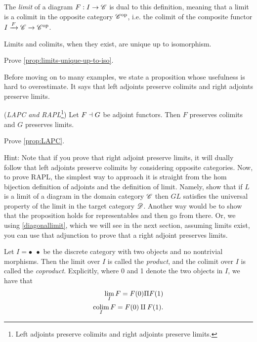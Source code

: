 \documentclass{article}[11pt]
\renewcommand{\dot}{\bullet }
\begin{document}
The \textit{limit} of a diagram $F: I \to \mathscr{C}$ is dual to this definition, meaning that a limit is a colimit in the opposite category $\mathscr{C}^{\text{op}}$, i.e. the colimit of the composite functor $I\xrightarrow{F} \mathscr{C} \to \mathscr{C}^{\text{op}}$.

\begin{proposition}\label{prop:limits-unique-up-to-iso} Limits and colimits, when they exist, are unique up to isomorphism.
\end{proposition}

\begin{exercise}
Prove \autoref{prop:limits-unique-up-to-iso}.
\end{exercise}

Before moving on to many examples, we state a proposition whose usefulness is hard to overestimate. It says that left adjoints preserve colimits and right adjoints preserve limits.

\begin{proposition}\label{prop:LAPC} (\textit{LAPC and RAPL}\footnote{Left adjoints preserve colimits and right adjoints preserve limits.}) Let $F\dashv G$ be adjoint functors. Then $F$ preserves colimits and $G$ preserves limits.
\end{proposition}

\begin{exercise}
Prove \autoref{prop:LAPC}.

 Hint: Note that if you prove that right adjoint preserve limits, it will dually follow that left adjoints preserve colimits by considering opposite categories. Now, to prove RAPL, the simplest way to approach it is straight from the hom bijection definition of adjoints and the definition of limit. Namely, show that if $L$ is a limit of a diagram in the domain category $\mathscr{C}$ then $GL$ satisfies the universal property of the limit in the target category $\mathscr{D}$. Another way would be to show that the proposition holds for representables and then go from there. Or, we using \autoref{diagonallimit}, which we will see in the next section, assuming limits exist, you can use that adjunction to prove that a right adjoint preserves limits.
\end{exercise}


\begin{definition} Let $I = \dot \ \  \dot$ be the discrete category with two objects and no nontrivial morphisms. Then the limit over $I$ is called the \textit{product}, and the colimit over $I$ is called the \textit{coproduct}. Explicitly, where 0 and 1 denote the two objects in $I$, we have that
\begin{align*}
	\lim_I F = F(0) \Pi  F(1) \\
	\mathop{\operatorname*{colim}}_I F = F(0) \amalg F(1).
\end{align*}
\end{definition}
\end{document}
